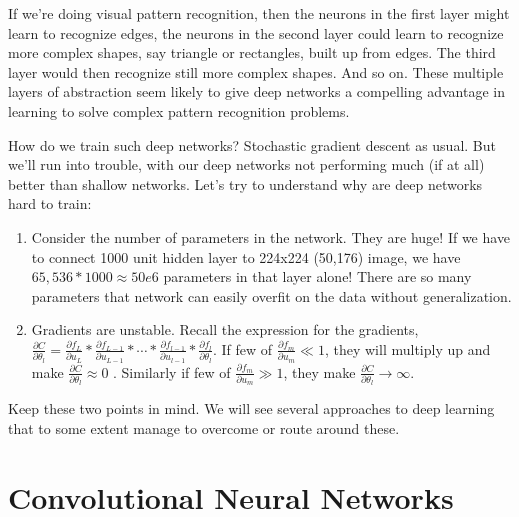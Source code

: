 \documentclass[a4paper]{tufte-handout}
\begin{document}
If we're doing visual pattern recognition, then the neurons in the first
layer might learn to recognize edges, the neurons in the second layer
could learn to recognize more complex shapes, say triangle or
rectangles, built up from edges. The third layer would then recognize
still more complex shapes. And so on. These multiple layers of
abstraction seem likely to give deep networks a compelling advantage in
learning to solve complex pattern recognition problems.

How do we train such deep networks? Stochastic gradient descent as
usual. But we'll run into trouble, with our deep networks not performing
much (if at all) better than shallow networks.
Let's try to understand why are deep networks hard to train:

\begin{enumerate}
\item
  Consider the number of parameters in the network. They are huge! If we
  have to connect 1000 unit hidden layer to 224x224 (50,176) image, we
  have \(65,536*1000 \approx 50e6\) parameters in that layer alone!
  There are so many parameters that network can easily overfit on the
  data without generalization.
\item
  Gradients are unstable. Recall the expression for the gradients,
  \(\frac{\partial C}{\partial \theta_l} = \frac{\partial f_L}{\partial u_L} * \frac{\partial f_{L-1}}{\partial u_{L-1}} * \cdots * \frac{\partial f_{l-1}}{\partial u_{l-1}} * \frac{\partial f_l}{\partial \theta_l}\).
  If few of \(\frac{\partial f_m}{\partial u_m} \ll 1\), they will
  multiply up and make
  \(\frac{\partial C}{\partial \theta_l} \approx 0\)
  . Similarly if few of
  \(\frac{\partial f_m}{\partial u_m} \gg 1\), they make
  \(\frac{\partial C}{\partial \theta_l} \to \infty\). 
\end{enumerate}

Keep these two points in mind. We will see several approaches to deep
learning that to some extent manage to overcome or route around these.


\section{Convolutional Neural
Networks}\label{convolutional-neural-networks}
\end{document}
